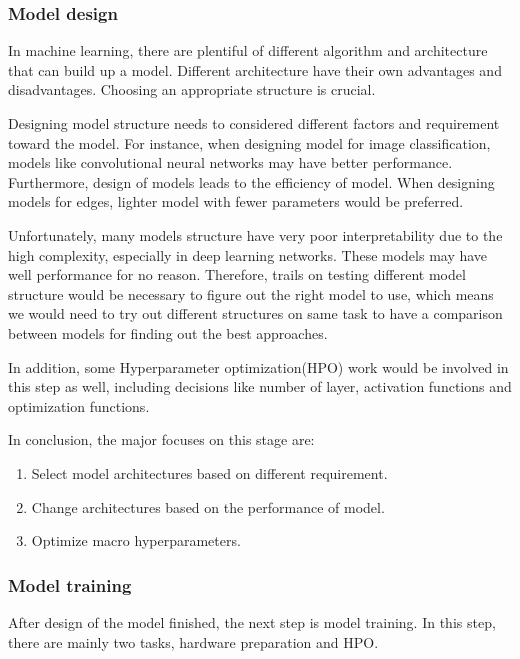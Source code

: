         \subsubsection{Model design}
            In machine learning, there are plentiful of different algorithm and architecture that can build up a model. Different architecture have their own advantages and disadvantages. Choosing an appropriate structure is crucial.

            Designing model structure needs to considered different factors and requirement toward the model. For instance, when designing model for image classification, models like convolutional neural networks may have better performance. Furthermore, design of models leads to the efficiency of model. When designing models for edges, lighter model with fewer parameters would be preferred.

            Unfortunately, many models structure have very poor interpretability due to the high complexity, especially in deep learning networks. These models may have well performance for no reason. Therefore, trails on testing different model structure would be necessary to figure out the right model to use, which means we would need to try out different structures on same task to have a comparison between models for finding out the best approaches.

            In addition, some Hyperparameter optimization(HPO) work would be involved in this step as well, including decisions like number of layer, activation functions and optimization functions.

            In conclusion, the major focuses on this stage are:
            \begin{enumerate}
                \item Select model architectures based on different requirement.
                \item Change architectures based on the performance of model.
                \item Optimize macro hyperparameters.
            \end{enumerate}
        
        \subsubsection{Model training}
            After design of the model finished, the next step is model training. In this step, there are mainly two tasks, hardware preparation and HPO.

